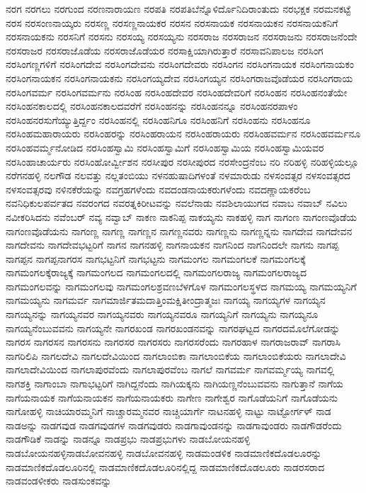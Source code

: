 {ನರಗ
ನರಗಲು
ನರಗುಂದ
ನರಣನಾರಾಯಣ
ನರಪತಿ
ನರಪತಿಬೆನ್ನೊಳಿರ್ದೊನಿದಿರಾಂತುದು
ನರಭಕ್ಷಕ
ನರಮನಕಟ್ಟೆ
ನರಸ
ನರಸಂಣನಾಯ್ಕರು
ನರಸಣ್ಣ
ನರಸಣ್ಣನಾಯಕರ
ನರಸನ
ನರಸನಾಯಕ
ನರಸನಾಯಕನ
ನರಸನಾಯಕನಿಗೆ
ನರಸನಾಯಕನು
ನರಸನಿಗೆ
ನರಸನು
ನರಸಯ್ಯ
ನರಸಯ್ಯನು
ನರಸರಾಜ
ನರಸರಾಜನ
ನರಸರಾಜನು
ನರಸರಾಜನೆಂದೇ
ನರಸರಾಜರ
ನರಸರಾಜೊಡೆಯ
ನರಸರಾಜೊಡೆಯರ
ನರಸಾಕ್ಷಿಯಾಗಿರುತ್ತಾರೆ
ನರಸಾವನಿಪಾಲಜ
ನರಸಿಂಗ
ನರಸಿಂಗಣ್ಣಗಳಿಗೆ
ನರಸಿಂಗದೇವ
ನರಸಿಂಗದೇವನು
ನರಸಿಂಗದೇವರು
ನರಸಿಂಗನ
ನರಸಿಂಗನಾಯಕ
ನರಸಿಂಗನಾಯಕಂ
ನರಸಿಂಗನಾಯಕನ
ನರಸಿಂಗನಾಯಕನು
ನರಸಿಂಗಯ್ಯದೇವ
ನರಸಿಂಗಯ್ಯನ
ನರಸಿಂಗರಾಜವೊಡೆಯರ
ನರಸಿಂಗರಾಯ
ನರಸಿಂಗವರ್ಮ
ನರಸಿಂಗವರ್ಮನು
ನರಸಿಂಹ
ನರಸಿಂಹದೇವರ
ನರಸಿಂಹದೇವರಿಗೆ
ನರಸಿಂಹನ
ನರಸಿಂಹನಂತೆಯೇ
ನರಸಿಂಹನಕಾಲದಲ್ಲಿ
ನರಸಿಂಹನಕಾಲದವರೆಗೆ
ನರಸಿಂಹನನ್ನು
ನರಸಿಂಹನನ್ನೂ
ನರಸಿಂಹನರಪಾಳಂ
ನರಸಿಂಹನರಸುಗೆಯ್ಯುತ್ತಿರ್ದ್ದಂ
ನರಸಿಂಹನಲ್ಲಿ
ನರಸಿಂಹನಿಗೂ
ನರಸಿಂಹನಿಗೆ
ನರಸಿಂಹನು
ನರಸಿಂಹನೂ
ನರಸಿಂಹಮಹಾರಾಯರು
ನರಸಿಂಹರನ್ನು
ನರಸಿಂಹರಾಯನ
ನರಸಿಂಹರಾಯರು
ನರಸಿಂಹವರ್ಮನ
ನರಸಿಂಹವರ್ಮನೂ
ನರಸಿಂಹವರ್ಮ್ಮನೋಡಿದ
ನರಸಿಂಹಸ್ವಾಮಿ
ನರಸಿಂಹಸ್ವಾಮಿಗೆ
ನರಸಿಂಹಸ್ವಾಮಿಯ
ನರಸಿಂಹಸ್ವಾಮಿಯವರ
ನರಸಿಂಹಾಚಾರ್ಯರು
ನರಸಿಂಹೋರ್ವ್ವೀಶನ
ನರಸೀಪುರ
ನರಸೀಪುರದ
ನರಸೇಂದ್ರನೆಂಬ
ನರಿ
ನರಿಹಳ್ಳಿ
ನರಿಹಳ್ಳಿಯಲ್ಲೂ
ನರೆಗನಹಳ್ಳಿ
ನಲಗೌಡ
ನಲವತ್ತು
ನಲ್ಲತಂಬಿಯು
ನಳನಹುಷಾದಿಗಳಂತೆ
ನಳಮಾರುಡು
ನಳಸಂವತ್ಸರ
ನಳಸಂವತ್ಸರದ
ನಳಸಂವತ್ಸರವು
ನಳಿನಕೆರೆಯನ್ನು
ನವಗ್ರಹಗಳೆಂದು
ನವದಂಡನಾಯಕರುಗಳೆಂದು
ನವದಣ್ಣಾಯಕರೆಂಬ
ನವನಿಧಿಕುಲಪರ್ವತದ
ನವರಂಗದ
ನವರತ್ನಕಿರೀಟವನ್ನು
ನವಲೆನಾಡು
ನವಶಿಲಾಯುಗದ
ನವಾಬ
ನವಾಬ್
ನವಿಲು
ನವೀಕರಿಸಿದನು
ನವೆಂಬರ್
ನವ್ಯ
ನವ್ವಾಬ್
ನಾಕಣ
ನಾಕನಿಪ್ಪ
ನಾಕಯ್ಯನು
ನಾಕಹಳ್ಳಿ
ನಾಗ
ನಾಗಂಣ
ನಾಗಂಣವೊಡೆಯ
ನಾಗಂಣವೊಡೆಯನು
ನಾಗಂಣ್ಣ
ನಾಗಣ್ಣ
ನಾಗಣ್ಣನ
ನಾಗಣ್ಣನವರು
ನಾಗಣ್ಣನು
ನಾಗಣ್ಣನ್ನನು
ನಾಗದೇವ
ನಾಗದೇವನ
ನಾಗದೇವನು
ನಾಗದೇವಭಟ್ಟರಿಗೆ
ನಾಗನ
ನಾಗನಹಳ್ಳಿ
ನಾಗನಾಯಕನ
ನಾಗನಿಂದ
ನಾಗನಿಂದಲೇ
ನಾಗನು
ನಾಗಪ್ಪ
ನಾಗಪ್ಪನ
ನಾಗಪ್ಪನಾಗರಸ
ನಾಗಭಟ್ಟನಿಗೆ
ನಾಗಭಟ್ಟನು
ನಾಗಮಂಗಲ
ನಾಗಮಂಗಲಕೆ
ನಾಗಮಂಗಲಕ್ಕೆ
ನಾಗಮಂಗಲಕ್ಕೆರಾಜ್ಯಕ್ಕೆ
ನಾಗಮಂಗಲದ
ನಾಗಮಂಗಲದಲ್ಲಿ
ನಾಗಮಂಗಲರಾಜ್ಯ
ನಾಗಮಂಗಲರಾಜ್ಯದ
ನಾಗಮಂಗಲವನ್ನು
ನಾಗಮಂಗಲವು
ನಾಗಮಂಗಲಶ್ರವಣಬೆಳಗೊಳ
ನಾಗಮಂಗಲಸ್ಥಳದ
ನಾಗಮಯ್ಯ
ನಾಗಮಯ್ಯನಿಗೆ
ನಾಗಮಯ್ಯನು
ನಾಗಮರ್ವ
ನಾಗಮಾರ್ಜಿತಮದಾತ್ತಿಂಮಕ್ಷಿತೀಂದ್ರಾತ್ಮಜಃ
ನಾಗಯ್ಯ
ನಾಗಯ್ಯಗಳ
ನಾಗಯ್ಯನ
ನಾಗಯ್ಯನನ್ನು
ನಾಗಯ್ಯನವರ
ನಾಗಯ್ಯನವರು
ನಾಗಯ್ಯನವರೂ
ನಾಗಯ್ಯನಿಗೆ
ನಾಗಯ್ಯನು
ನಾಗಯ್ಯನೂ
ನಾಗಯ್ಯನೆಂಬುವವನು
ನಾಗಯ್ಯನೇ
ನಾಗರಖಂಡ
ನಾಗರಖಂಡನವನ್ನು
ನಾಗರಘಟ್ಟದ
ನಾಗರದಮೊಲೆಗೋಡನ್ನು
ನಾಗರಸ
ನಾಗರಸನ
ನಾಗರಸನು
ನಾಗರಸರ
ನಾಗರಸರು
ನಾಗರಸರೆಂದು
ನಾಗರಹಾಳ
ನಾಗರಾಜರಾವ್
ನಾಗರಾಸಿ
ನಾಗರಿಲಿಪಿ
ನಾಗಲದೇವಿ
ನಾಗಲದೇವಿಯಿಂದ
ನಾಗಲಾಂಬಿಕಾ
ನಾಗಲಾಂಬಿಕೆಯ
ನಾಗಲಾಂಬಿಕೆಯರು
ನಾಗಲಾದೇವಿ
ನಾಗಲಾದೇವಿಯಿಂದ
ನಾಗಲಾಪುರವೆಂದು
ನಾಗಲಾಪುರವೆಂಬ
ನಾಗಲೆ
ನಾಗವರ್ಮ
ನಾಗವರ್ಮ್ಮಯ್ಯ
ನಾಗವಲ್ಲಿ
ನಾಗಶಕ್ತಿ
ನಾಗಾಂಬಾ
ನಾಗಾಭಟ್ಟರಿಗೆ
ನಾಗಿದ್ದನೆಂದು
ನಾಗಿಯಕ್ಕನು
ನಾಗಿಯಣ್ಣನೆಂಬುವವನು
ನಾಗುತ್ತಾನೆ
ನಾಗೆಯ
ನಾಗೆಯನಾಯಕ
ನಾಗೆಯನಾಯಕನ
ನಾಗೆಯನಾಯಕರು
ನಾಗೇಣ
ನಾಗೇಶ್ವರ
ನಾಗೊಡೆಯನಿಗೆ
ನಾಗೊಡೆಯನು
ನಾಗೋಹಳ್ಳಿ
ನಾಚಿಯಾರಮ್ಮನಿಗೆ
ನಾಚ್ಚಾರಮ್ಮನವರ
ನಾಚ್ಚಿಯಾರ್ಗೆ
ನಾಟನಹಳ್ಳಿ
ನಾಟ್ಟು
ನಾಟ್ಟೋರ್ಗಳ್
ನಾಡ
ನಾಡಅನ್ನು
ನಾಡಗವುಡ
ನಾಡಗವುಡಗಳ
ನಾಡಗವುಡರು
ನಾಡಗಾವುಂಡನನ್ನು
ನಾಡಗಾವುಂಡರು
ನಾಡಗೌಡರೆಂದು
ನಾಡಗೌಡಿಕೆ
ನಾಡನ್ನು
ನಾಡನ್ನೂ
ನಾಡಪ್ರಭು
ನಾಡಪ್ರಭುಗಳು
ನಾಡಬೋಯನಹಳ್ಳಿ
ನಾಡಬೋಯನಹಳ್ಳಿನಾಡಬೋವನಹಳ್ಳಿ
ನಾಡಬೋವನಹಳ್ಳಿ
ನಾಡಮಂಡಳಿಕ
ನಾಡಮಾಣಿಕದೊಡಲೂರನ್ನು
ನಾಡಮಾಣಿಕದೊಡಲೂರಿನಲ್ಲಿ
ನಾಡಮಾಣಿಕದೊಡಲೂರಿನಲ್ಲಿದ್ದ
ನಾಡಮಾಣಿಕದೊಡಲೂರು
ನಾಡರಸರಾದ
ನಾಡವಂಡಳೀಕರು
ನಾಡಸುಂಕವನ್ನು
}
